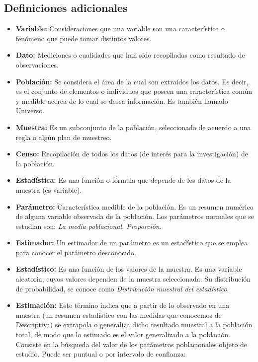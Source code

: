 \documentclass[a4paper]{report} %
\begin{document}
\subsection*{Definiciones adicionales}
\begin{itemize}
    \item \textbf{Variable:} Consideraciones que una variable son una caracter\'istica o fen\'omeno que puede tomar distintos valores.
    \item \textbf{Dato:} Mediciones o cualidades que han sido recopiladas como resultado de observaciones.
    \item \textbf{Poblaci\'on:} Se considera el \'area de la cual son extra\'idos los datos. Es decir, es el conjunto de elementos o individuos que poseen una caracter\'istica com\'un y medible acerca de lo cual se desea informaci\'on. Es tambi\'en llamado Universo.
    \item \textbf{Muestra:} Es un subconjunto de la poblaci\'on, seleccionado de acuerdo a una regla o alg\'un plan de muestreo.
    \item \textbf{Censo:} Recopilaci\'on de todos los datos (de inter\'es para la investigaci\'on) de la poblaci\'on.
    \item \textbf{Estad\'istica:} Es una funci\'on o f\'ormula que depende de los datos de la muestra (es variable).
    \item \textbf{Par\'ametro:} Caracter\'istica medible de la poblaci\'on. Es un resumen num\'erico de alguna variable observada de la poblaci\'on. Los par\'ametros normales que se estudian son: \textit{La media poblacional, Proporci\'on.}
    \item \textbf{Estimador:} Un estimador de un par\'ametro es un estad\'istico que se emplea para conocer el par\'ametro desconocido.
    \item \textbf{Estad\'istico:} Es una funci\'on de los valores de la muestra. Es una variable aleatoria, cuyos valores dependen de la muestra seleccionada. Su distribuci\'on de probabilidad, se conoce como \textit{Distribuci\'on muestral del estad\'istico}.
    \item \textbf{Estimaci\'on:} Este t\'ermino indica que a partir de lo observado en una muestra (un resumen estad\'istico con las medidas que conocemos de Descriptiva) se extrapola o generaliza dicho resultado muestral a la poblaci\'on total, de modo que lo estimado es el valor generalizado a la poblaci\'on. Consiste en la b\'usqueda del valor de los par\'ametros poblacionales objeto de estudio. Puede ser puntual o por intervalo de confianza:

\end{itemize}
\end{document}
